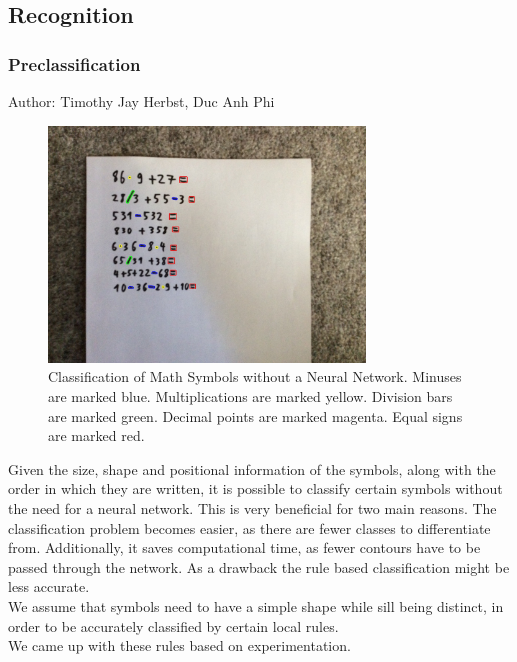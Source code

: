 \documentclass[11pt]{article}
\begin{document}
	\pagebreak\subsection{Recognition}
	\subsubsection{Preclassification}
	
	\small{Author: Timothy Jay Herbst, Duc Anh Phi} \newline \newline
	\begin{figure}[h!]
		\centering
		\includegraphics[width=0.75\textwidth]{ImagesForReport/preclassify.jpg}
		\caption{Classification of Math Symbols without a Neural Network.
		Minuses are marked blue. Multiplications are marked yellow.  Division bars are marked green. Decimal points are marked magenta. Equal signs are marked red.}
		\label{fig:preclassify}
	\end{figure}

	Given the size, shape and positional information of the symbols, along with the order in which they are written, it is possible to classify certain symbols without the need for a neural network. 
	This is very beneficial for two main reasons. 
	The classification problem becomes easier, as there are fewer classes to differentiate from.
	Additionally, it saves computational time, as fewer contours have to be passed through the network. As a drawback the rule based classification might be less accurate.\\
	We assume that symbols need to have a simple shape while sill being distinct, in order to be accurately classified by certain local rules.\\
	We came up with these rules based on experimentation.
	
\end{document}
